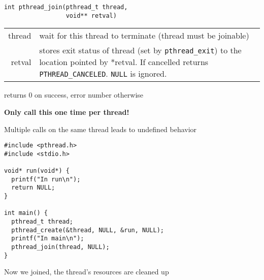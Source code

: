  \begin{slide}


    \begin{verbatim}
int pthread_join(pthread_t thread,
                 void** retval)
    \end{verbatim}
    \medskip

    \begin{tabular}{rp{10cm}}
  thread & wait for this thread to terminate (thread must be joinable) \\

  retval & stores exit status of thread (set by {\tt pthread\_exit}) to
                 the location pointed by *retval. If cancelled returns
                 {\tt PTHREAD\_CANCELED}. {\tt NULL} is ignored. \\
    \end{tabular}

  returns 0 on success, error number otherwise 
  \medskip

  {\bf Only call this one time per thread!}

  \leftspace{}Multiple calls on the same thread leads to undefined behavior

  \end{slide}

  \begin{slide}


    \begin{verbatim}
#include <pthread.h>
#include <stdio.h>

void* run(void*) {
  printf("In run\n");
  return NULL;
}

int main() {
  pthread_t thread;
  pthread_create(&thread, NULL, &run, NULL);
  printf("In main\n");
  pthread_join(thread, NULL);
}
    \end{verbatim}
    \medskip

    Now we joined, the thread's resources are cleaned up

  \end{slide}

